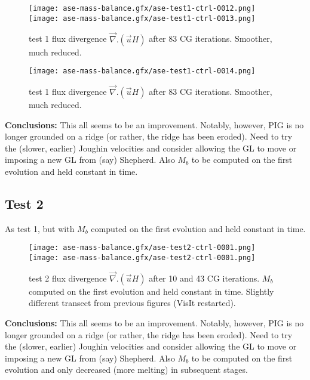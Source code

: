 \documentclass{article}
\begin{document}
\begin{figure}
\begin{center}
\texttt{[image: ase-mass-balance.gfx/ase-test1-ctrl-0012.png]}
\texttt{[image: ase-mass-balance.gfx/ase-test1-ctrl-0013.png]}
\end{center}
\caption{\protect{\label{fig::test1c}}} test 1 flux divergence $\vec{\nabla}. (\vec{u} H)$
after 83 CG iterations. Smoother, much reduced.
\end{figure}


\begin{figure}
\begin{center}
\texttt{[image: ase-mass-balance.gfx/ase-test1-ctrl-0014.png]}
\end{center}
\caption{\protect{\label{fig::test1c}}} test 1  flux divergence $\vec{\nabla}. (\vec{u} H)$
after 83 CG iterations. Smoother, much reduced.
\end{figure}

{\large {\bf Conclusions:}} This all seems to be an improvement. Notably, however, PIG is no longer grounded on a ridge
(or rather, the ridge has been eroded). Need to try the (slower, earlier) Joughin velocities and consider allowing the
GL to move or imposing a new GL from (say) Shepherd. Also $M_b$ to be computed on the first evolution and held constant in time.

\subsection{Test 2}

As test 1, but with $M_b$ computed on the first evolution and held constant in time.

\begin{figure}
\begin{center}
\texttt{[image: ase-mass-balance.gfx/ase-test2-ctrl-0001.png]}
\texttt{[image: ase-mass-balance.gfx/ase-test2-ctrl-0001.png]}
\end{center}
\caption{\protect{\label{fig::test1b}}} test 2 flux divergence $\vec{\nabla}. (\vec{u} H)$
after 10 and 43 CG iterations. $M_b$ computed on the first evolution and held constant in time.
Slightly different transect from previous figures (VisIt restarted).
\end{figure}


{\large {\bf Conclusions:}} This all seems to be an improvement. Notably, however, PIG is no longer grounded on a ridge
(or rather, the ridge has been eroded). Need to try the (slower, earlier) Joughin velocities and consider allowing the
GL to move or imposing a new GL from (say) Shepherd. Also $M_b$ to be computed on the first evolution and only decreased 
(more melting) in subsequent stages. 



\end{document}

